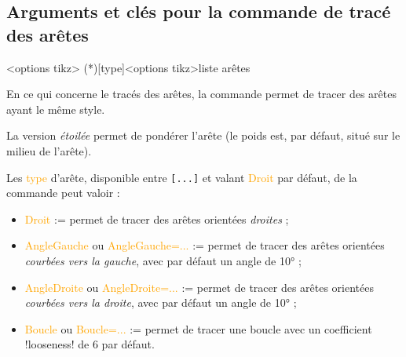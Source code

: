 \documentclass[french,a4paper,11pt]{article}
\newcommand\Cle[1]{{\small\sffamily\textlangle \textcolor{orange}{#1}\textrangle}}
\begin{document}
{{\begin{DemoCode}[]
\begin{GrapheTikz}[CouleurSommets={brown/purple},TypeSommets=ellipse,Police={}]
\end{GrapheTikz}
\end{DemoCode}

\begin{DemoCode}[]
\begin{GrapheTikz}[Epaisseur={very thick},Grille={5,4},DimensionSommets=1.5cm]
\end{GrapheTikz}
\end{DemoCode}

\begin{DemoCode}[]
\begin{GrapheTikz}[TypeSommets=diamond,DimensionSommets=2cm/1.5cm]
\end{GrapheTikz}
\end{DemoCode}

\pagebreak

\subsection{Arguments et clés pour la commande de tracé des arêtes}

\begin{DemoCode}
\begin{GrapheTikz}[clés]<options tikz>
	\GrphTraceAretes(*)[type]<options tikz>{liste arêtes}
\end{GrapheTikz}
\end{DemoCode}

\begin{tipblock}
En ce qui concerne le tracés des arêtes, la commande permet de tracer des arêtes ayant le même style.

\smallskip

La version \textit{étoilée} permet de pondérer l'arête (le poids est, par défaut, situé sur le milieu de l'arête).

\smallskip

Les \Cle{type} d'arête, disponible entre \texttt{[...]} et valant \Cle{Droit} par défaut, de la commande peut valoir :

\begin{itemize}
	\item \Cle{Droit} := permet de tracer des arêtes orientées \textit{droites} ;
	\item \Cle{AngleGauche} ou \Cle{AngleGauche=...} := permet de tracer des arêtes orientées \textit{courbées vers la gauche}, avec par défaut un angle de 10° ;
	\item \Cle{AngleDroite} ou \Cle{AngleDroite=...} := permet de tracer des arêtes orientées \textit{courbées vers la droite}, avec par défaut un angle de 10° ;
	\item \Cle{Boucle} ou \Cle{Boucle=...} := permet de tracer une boucle avec un coefficient \motcletex!looseness! de 6 par défaut.
\end{itemize}


\end{tipblock}}}
\end{document}
